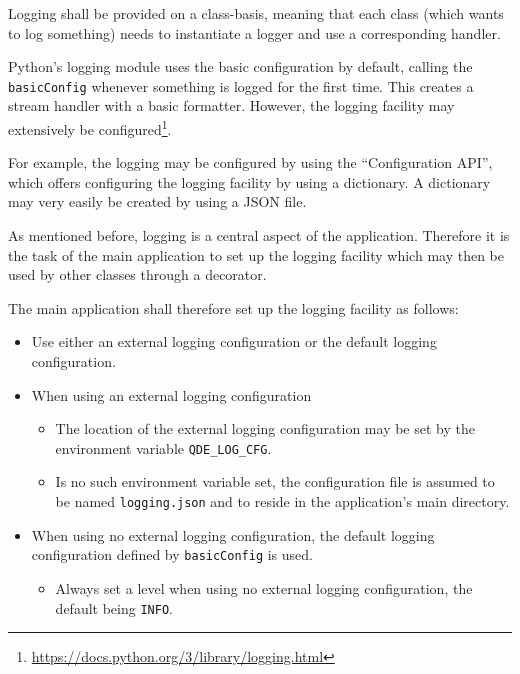\documentclass[10pt, openright, notitlepage]{scrreprt}
\begin{document}
Logging shall be provided on a class-basis, meaning that each class (which wants
to log something) needs to instantiate a logger and use a corresponding handler.

Python's logging module uses the basic configuration by default, calling the
\texttt{basicConfig} whenever something is logged for the first time. This
creates a stream handler with a basic formatter. However, the logging facility
may extensively be
configured\footnote{\url{https://docs.python.org/3/library/logging.html}}.

For example, the logging may be configured by using the ``Configuration API'',
which offers configuring the logging facility by using a dictionary. A
dictionary may very easily be created by using a JSON file.

As mentioned before, logging is a central aspect of the application. Therefore
it is the task of the main application to set up the logging facility which may
then be used by other classes through a decorator.

The main application shall therefore set up the logging facility as follows:

\begin{itemize}
\item Use either an external logging configuration or the default logging configuration.

\item When using an external logging configuration

\begin{itemize}
\item The location of the external logging configuration may be set by the
environment variable \texttt{QDE\_LOG\_CFG}.

\item Is no such environment variable set, the configuration file is assumed to be
named \texttt{logging.json} and to reside in the application's main
directory.
\end{itemize}

\item When using no external logging configuration, the default logging configuration
defined by \texttt{basicConfig} is used.

\begin{itemize}
\item Always set a level when using no external logging configuration, the default
being \texttt{INFO}.
\end{itemize}
\end{itemize}
\end{document}
